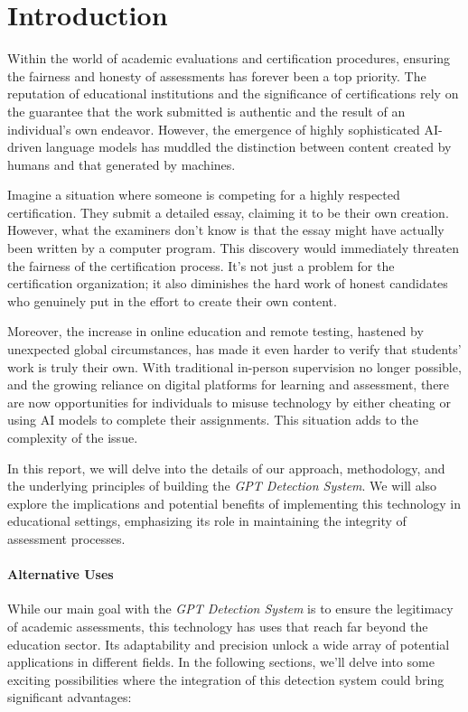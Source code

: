 \chapter{Introduction}

Within the world of academic evaluations and certification procedures, ensuring the fairness and honesty of assessments 
has forever been a top priority. The reputation of educational institutions and the significance of certifications 
rely on the guarantee that the work submitted is authentic and the result of an individual's own endeavor. 
However, the emergence of highly sophisticated AI-driven language models has muddled the distinction between content 
created by humans and that generated by machines.

Imagine a situation where someone is competing for a highly respected certification. They submit a detailed essay, 
claiming it to be their own creation. However, what the examiners don't know is that the essay might have actually 
been written by a computer program. This discovery would immediately threaten the fairness of the certification process. 
It's not just a problem for the certification organization; it also diminishes the hard work of honest candidates who 
genuinely put in the effort to create their own content.

Moreover, the increase in online education and remote testing, hastened by unexpected global circumstances, 
has made it even harder to verify that students' work is truly their own. With traditional in-person supervision no 
longer possible, and the growing reliance on digital platforms for learning and assessment, there are now opportunities 
for individuals to misuse technology by either cheating or using AI models to complete their assignments. This situation 
adds to the complexity of the issue.

In this report, we will delve into the details of our approach, methodology, and the underlying principles of 
building the \textit{GPT Detection System}. We will also explore the implications and potential benefits of implementing 
this technology in educational settings, emphasizing its role in maintaining the integrity of assessment processes. 

\subsubsection{Alternative Uses}

While our main goal with the \textit{GPT Detection System} is to ensure the legitimacy of academic assessments, 
this technology has uses that reach far beyond the education sector. Its adaptability and precision unlock a wide array 
of potential applications in different fields. In the following sections, we'll delve into some exciting possibilities 
where the integration of this detection system could bring significant advantages:


